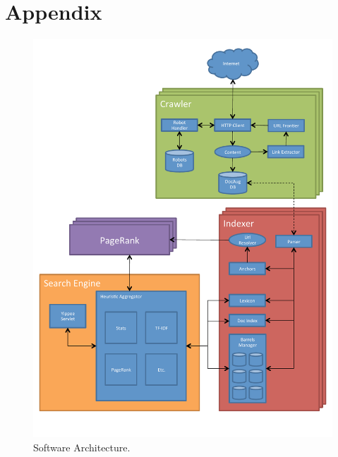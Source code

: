 \documentclass[11pt, letterpaper, oneside, twocolumn]{article}
\begin{document}
\section{Appendix}
\label{sec:SOAR} %
\begin{figure}[t]
  \centering
  \includegraphics[scale=0.25]{figures/yippee_map.pdf}
  \caption{Software Architecture.}
\end{figure}
\end{document}
